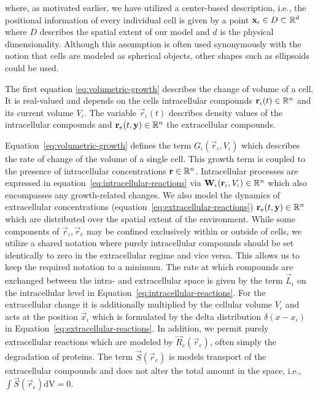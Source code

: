where, as motivated earlier, we have utilized a center-based description, i.e., the positional
information of every individual cell is given by a point $\mathbf{x}_\iota\in D\subset\mathbb{R}^d$ where $D$
describes the spatial extent of our model and $d$ is the physical dimensionality.
Although this assumption is often used synonymously with the notion that cells are modeled as
spherical objects, other shapes such as ellipsoids could be used.

The first equation \eqref{eq:volumetric-growth} describes the change of volume of a cell.
It is real-valued and depends on the cells intracellular compounds $\mathbf{r}_\iota(t)\in\mathbb{R}^n$ and
its current volume $V_\iota$.
The variable $\vec{r}_\iota(t)$ describes density values of the intracellular compounds and
$\mathbf{r}_e(t,\mathbf{y})\in\mathbb{R}^n$ the extracellular compounds.

Equation~\eqref{eq:volumetric-growth} defines the term $G_\iota(\vec{r}_\iota, V_\iota)$ which
describes the rate of change of the volume of a single cell.
This growth term is coupled to the presence of intracellular concentrations $\mathbf{r}\in\mathbb{R}^n$.
Intracellular processes are expressed in equation~\eqref{eq:intracellular-reactions} via
$\mathbf{W}_\iota(\mathbf{r}_\iota, V_\iota)\in\mathbb{R}^n$ which also encompasses any growth-related changes.
We also model the dynamics of extracellular concentrations
(equation~\eqref{eq:extracellular-reactions}) $\mathbf{r}_e(t,\mathbf{y})\in\mathbb{R}^n$ which are distributed
over the spatial extent of the environment.
While some components of $\vec{r}_\iota,\vec{r}_e$ may be confined exclusively within or outside of
cells, we utilize a shared notation where purely intracellular compounds should be set identically
to zero in the extracellular regime and vice versa.
This allows us to keep the required notation to a minimum.
The rate at which compounds are exchanged between the intra- and extracellular space is given by
the term $\vec{L}_\iota$ on the intracellular level in
Equation~\eqref{eq:intracellular-reactions}.
For the extracellular change it is additionally multiplied by the cellular volume $V_\iota$ and acts
at the position $\vec{x}_\iota$ which is formulated by the delta distribution $\delta(x-x_\iota)$ in
Equation~\eqref{eq:extracellular-reactions}.
In addition, we permit purely extracellular reactions which are modeled by $\vec{R}_e(\vec{r}_e)$,
often simply the degradation of proteins.
The term $\vec{S}(\vec{r}_e)$ is models transport of the extracellular compounds and does not alter
the total amount in the space, i.e., $\int\vec{S}(\vec{r}_e)\text{dV}=0$.

